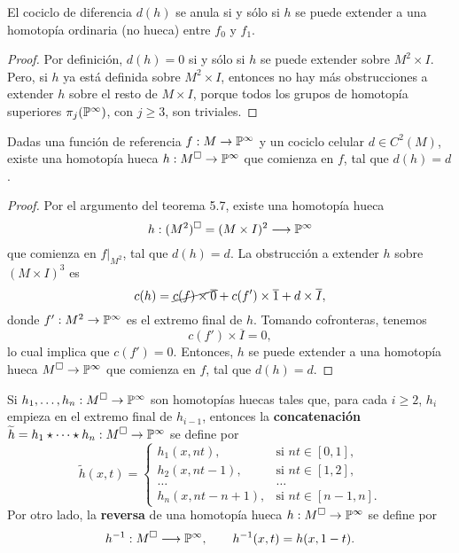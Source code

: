 \begin{proposition}
El cociclo de diferencia $d(h)$ se anula si y sólo si $h$ se puede extender a una homotopía ordinaria (no hueca) entre $f_0$ y $f_1$.
\end{proposition}

\begin{proof}
Por definición, $d(h) = 0$ si y sólo si $h$ se puede extender sobre $M^2 \times I$. Pero, si $h$ ya está definida sobre $M^2 \times I$, entonces no hay más obstrucciones a extender $h$ sobre el resto de $M \times I$, porque todos los grupos de homotopía superiores $\pi_j(\P^\infty)$, con $j \ge 3$, son triviales.
\end{proof}

\begin{lemma}
Dadas una función de referencia $f : M \to \P^\infty$ y un cociclo celular $d \in C^2(M)$, existe una homotopía hueca $h : M^\square \to \P^\infty$ que comienza en $f$, tal que $d(h) = d$.
\end{lemma}

\begin{proof}
Por el argumento del teorema 5.7, existe una homotopía hueca
$$h : (M^2)^\square = (M \times I)^2 \longrightarrow \P^\infty$$
que comienza en $f \vert_{M^2}$, tal que $d(h) = d$. La obstrucción a extender $h$ sobre $(M \times I)^3$ es
$$c(h) = \cancel {c(f) \times \overline 0} + c(f') \times \overline 1 + d \times \overline I,$$
donde $f' : M^2 \to \P^\infty$ es el extremo final de $h$. Tomando cofronteras, tenemos
$$c(f') \times \overline I = 0,$$
lo cual implica que $c(f') = 0$. Entonces, $h$ se puede extender a una homotopía hueca $M^\square \to \P^\infty$ que comienza en $f$, tal que $d(h) = d$.
\end{proof}

Si $h_1, \dots, h_n : M^\square \to \P^\infty$ son homotopías huecas tales que, para cada $i \ge 2$, $h_i$ empieza en el extremo final de $h_{i-1}$, entonces la \textbf{concatenación} $\widetilde h = h_1 \star \dots \star h_n : M^\square \to \P^\infty$ se define por
$$
\widetilde h(x,t) =
  \begin{cases}
    h_1(x, nt),     & \text{si } nt \in [0,1], \\
    h_2(x, nt - 1), & \text{si } nt \in [1,2], \\
    \dots & \dots \\
    h_n(x, nt - n + 1), & \text{si } nt \in [n-1,n].
  \end{cases}
$$
Por otro lado, la \textbf{reversa} de una homotopía hueca $h : M^\square \to \P^\infty$ se define por
$$h^{-1} : M^\square \longrightarrow \P^\infty, \qquad h^{-1}(x, t) = h(x, 1-t).$$

